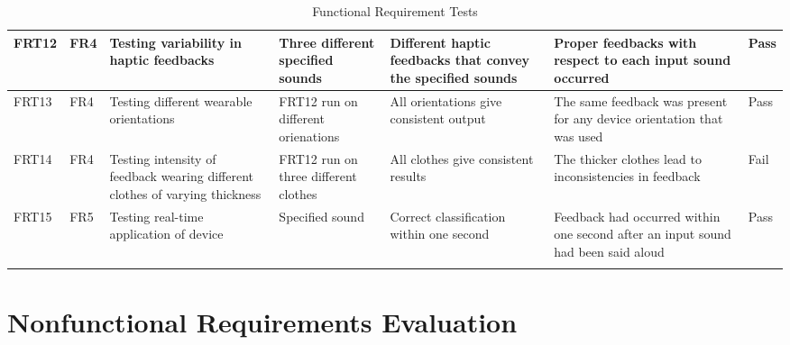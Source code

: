\documentclass[12pt, titlepage]{article}
\begin{document}
\begin{longtable}{|p{1.4cm}|p{1cm}|p{3cm}|p{1.5cm}|p{2.5cm}|p{2cm}|p{1.2cm}|}
  FRT12       & FR4          & Testing variability in haptic feedbacks                                      & Three different specified sounds                  & Different haptic feedbacks that convey the specified sounds &          Proper feedbacks with respect to each input sound occurred              &                              {\color[HTML]{32CB00} Pass}                      \\ \hline
  FRT13       & FR4          & Testing different wearable orientations                                      & FRT12 run on different orienations                & All orientations give consistent output                     &          The same feedback was present for any device orientation that was used              &                 {\color[HTML]{32CB00} Pass}                                   \\ \hline
  FRT14       & FR4          & Testing intensity of feedback wearing different clothes of varying thickness & FRT12 run on three different clothes              & All clothes give consistent results                         &          The thicker clothes lead to inconsistencies in feedback              &                      {\color[HTML]{FE0000} Fail}                              \\ \hline
  FRT15       & FR5          & Testing real-time application of device                                      & Specified sound                                   & Correct classification within one second                    &          Feedback had occurred within one second after an input sound had been said aloud              &                  {\color[HTML]{32CB00} Pass}                                  \\ \hline
  \caption{Functional Requirement Tests}
  \label{functionalRequirementTests}
\end{longtable}

\section{Nonfunctional Requirements Evaluation}
\end{document}
